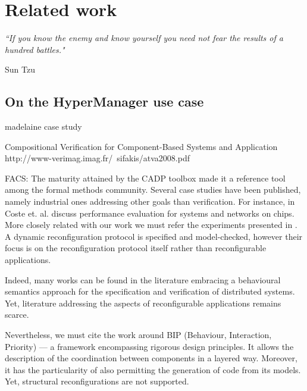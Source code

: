 
\chapter{Related work} 
\label{chap:related} 


\epigraph{\textit{“If you know the enemy and know yourself you need 
                             not fear the results of a hundred battles."}}{Sun Tzu}

\minitoc



\section{On the HyperManager use case}
\label{sec:relhyper}


	\cite{BHHM:FACS11} madelaine case study
	
	
	Compositional Verification for Component-Based Systems and Application
	http://www-verimag.imag.fr/~sifakis/atva2008.pdf
	\cite{BBN+10} 


	FACS:
	  The maturity attained by the CADP toolbox 
		made it a reference tool among the formal methods community.  Several case studies have been published, 
		namely industrial ones addressing other goals than verification. For instance, in \cite{conf/cav/CosteHLS09}
	Coste et. al. discuss performance evaluation for systems and networks on chips.			
	 More closely related with our work we must refer the experiments presented in 
	 \cite{conf/dais/CornejoGMP01}. A dynamic reconfiguration protocol is specified and model-checked,
	 however their focus is on the reconfiguration protocol itself rather than reconfigurable applications.
		 
		  	
		Indeed, many works can be found in the literature embracing a behavioural semantics
		approach for the specification and verification of distributed systems. Yet, 
		literature addressing the aspects of reconfigurable applications remains 
		scarce. 

		
 Nevertheless, we must cite the work around
	    BIP (Behaviour, Interaction, Priority) \cite{BBB+11a} --- a framework 
	 encompassing rigorous design principles. It allows the description of the 
	 coordination between components
	 in a layered way. Moreover, it has the particularity of also permitting the 
	 generation of code from its models. Yet, structural reconfigurations are not supported. 
	 	
